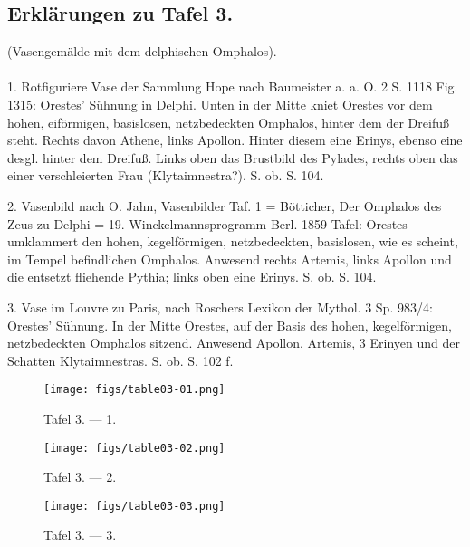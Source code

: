 \documentclass[a4paper, 11pt, oneside]{article}
\begin{document}
\subsection{Erklärungen zu Tafel 3.}
\begin{center}
(Vasengemälde mit dem delphischen Omphalos).
\end{center}
\paragraph{}
1. Rotfiguriere Vase der Sammlung Hope nach Baumeister a. a. O. 2 S. 1118 Fig. 1315: Orestes' Sühnung in Delphi. Unten in der Mitte kniet Orestes vor dem hohen, eiförmigen, basislosen, netzbedeckten Omphalos, hinter dem der Dreifuß steht. Rechts davon Athene, links Apollon. Hinter diesem eine Erinys, ebenso eine desgl. hinter dem Dreifuß. Links oben das Brustbild des Pylades, rechts oben das einer verschleierten Frau (Klytaimnestra?). S. ob. S. 104.

2. Vasenbild nach O. Jahn, Vasenbilder Taf. 1 = Bötticher, Der Omphalos des Zeus zu Delphi = 19. Winckelmannsprogramm Berl. 1859 Tafel: Orestes umklammert den hohen, kegelförmigen, netzbedeckten, basislosen, wie es scheint, im Tempel befindlichen Omphalos. Anwesend rechts Artemis, links Apollon und die entsetzt fliehende Pythia; links oben eine Erinys. S. ob. S. 104.

3. Vase im Louvre zu Paris, nach Roschers Lexikon der Mythol. 3 Sp. 983/4: Orestes' Sühnung. In der Mitte Orestes, auf der Basis des hohen, kegelförmigen, netzbedeckten Omphalos sitzend. Anwesend Apollon, Artemis, 3 Erinyen und der Schatten Klytaimnestras. S. ob. S. 102 f.
\clearpage
\vspace*{\fill}
\begin{figure}[H]
\centering
\texttt{[image: figs/table03-01.png]}
\caption{Tafel 3. --- 1.}
\end{figure}
\vspace*{\fill}
\clearpage
\begin{landscape}
\vspace*{\fill}
\begin{figure}[H]
\centering
\texttt{[image: figs/table03-02.png]}
\caption{Tafel 3. --- 2.}
\end{figure}
\vspace*{\fill}
\clearpage
\vspace*{\fill}
\begin{figure}[H]
\centering
\texttt{[image: figs/table03-03.png]}
\caption{Tafel 3. --- 3.}
\end{figure}
\vspace*{\fill}
\clearpage
\end{landscape}
\end{document}
